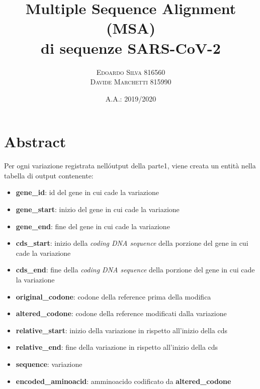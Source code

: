 \documentclass[11pt,italian]{article}
\title{Multiple Sequence Alignment (MSA) \\ di sequenze SARS-CoV-2}
\date{A.A.: 2019/2020}
\author{
    \textsc{Edoardo Silva} 816560 \\
    \textsc{Davide Marchetti} 815990
}
\begin{document}
\maketitle

\section{Abstract}
Per ogni variazione registrata nell\'output della parte1, viene creata un entità nella tabella di output contenente:

\begin{itemize}
    \item \textbf{gene\_id}: id del gene in cui cade la variazione
    \item \textbf{gene\_start}: inizio del gene in cui cade la variazione
    \item \textbf{gene\_end}: fine del gene in cui cade la variazione
    \item \textbf{cds\_start}: inizio della \textit{coding DNA sequence} della porzione del gene in cui cade la variazione
    \item \textbf{cds\_end}: fine della \textit{coding DNA sequence} della porzione del gene in cui cade la variazione
    \item \textbf{original\_codone}: codone della reference prima della modifica
    \item \textbf{altered\_codone}: codone della reference modificati dalla variazione
    \item \textbf{relative\_start}: inizio della variazione in rispetto all'inizio della cds
    \item \textbf{relative\_end}: fine della variazione in rispetto all'inizio della cds
    \item \textbf{sequence}: variazione
    \item \textbf{encoded\_aminoacid}: amminoacido codificato da \textbf{altered\_codone}
\end{itemize}
\end{document}
